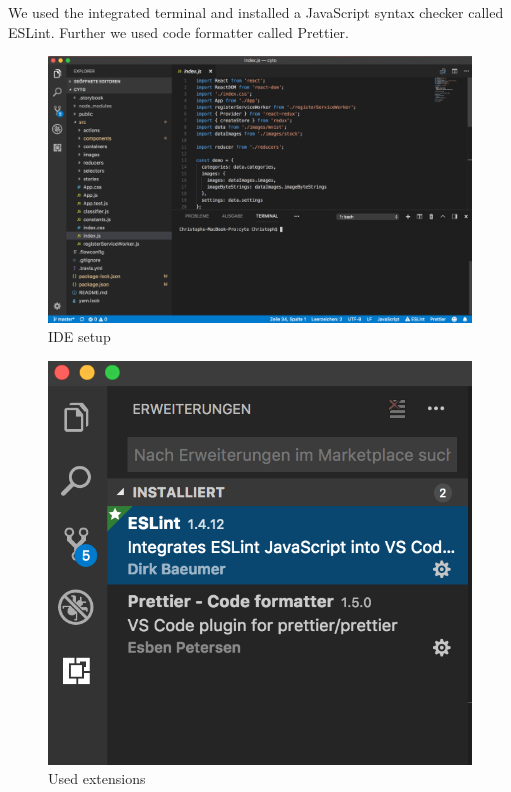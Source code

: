 We used the integrated terminal and installed a JavaScript syntax checker called ESLint. Further we used code formatter called Prettier. 

\begin{figure}[H]
	\centering
	\includegraphics[width=\linewidth]{bilder/cyto/IDE.png}
	\caption{IDE setup}
	\label{fig:IDE}
\end{figure}

\begin{figure}[H]
	\centering
	\includegraphics[scale=0.5]{bilder/cyto/LINT.png}
	\caption{Used extensions}
	\label{fig:Extensions}
\end{figure}

